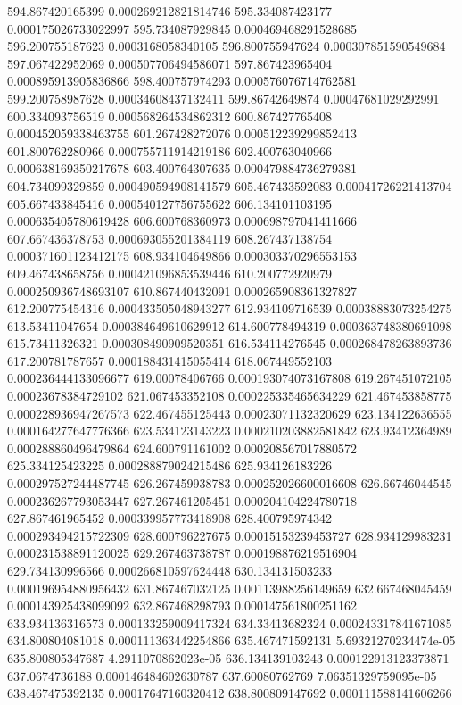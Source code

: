 {594.867420165399 0.000269212821814746
595.334087423177 0.000175026733022997
595.734087929845 0.000469468291528685
596.200755187623 0.0003168058340105
596.800755947624 0.000307851590549684
597.067422952069 0.000507706494586071
597.867423965404 0.000895913905836866
598.400757974293 0.000576076714762581
599.200758987628 0.00034608437132411
599.86742649874 0.00047681029292991
600.334093756519 0.000568264534862312
600.867427765408 0.000452059338463755
601.267428272076 0.000512239299852413
601.800762280966 0.000755711914219186
602.400763040966 0.000638169350217678
603.400764307635 0.000479884736279381
604.734099329859 0.000490594908141579
605.467433592083 0.00041726221413704
605.667433845416 0.000540127756755622
606.134101103195 0.000635405780619428
606.600768360973 0.000698797041411666
607.667436378753 0.000693055201384119
608.267437138754 0.000371601123412175
608.934104649866 0.000303370296553153
609.467438658756 0.000421096853539446
610.200772920979 0.000250936748693107
610.867440432091 0.000265908361327827
612.200775454316 0.000433505048943277
612.934109716539 0.00038883073254275
613.53411047654 0.000384649610629912
614.600778494319 0.000363748380691098
615.73411326321 0.000308490909520351
616.534114276545 0.000268478263893736
617.200781787657 0.000188431415055414
618.067449552103 0.000236444133096677
619.00078406766 0.000193074073167808
619.267451072105 0.00023678384729102
621.067453352108 0.000225335465634229
621.467453858775 0.000228936947267573
622.467455125443 0.00023071132320629
623.134122636555 0.000164277647776366
623.534123143223 0.000210203882581842
623.93412364989 0.000288860496479864
624.600791161002 0.000208567017880572
625.334125423225 0.000288879024215486
625.934126183226 0.000297527244487745
626.267459938783 0.000252026600016608
626.66746044545 0.000236267793053447
627.267461205451 0.000204104224780718
627.867461965452 0.000339957773418908
628.400795974342 0.000293494215722309
628.600796227675 0.00015153239453727
628.934129983231 0.000231538891120025
629.267463738787 0.000198876219516904
629.734130996566 0.000266810597624448
630.134131503233 0.000196954880956432
631.867467032125 0.00113988256149659
632.667468045459 0.000143925438099092
632.867468298793 0.000147561800251162
633.934136316573 0.000133259009417324
634.33413682324 0.000243317841671085
634.800804081018 0.000111363442254866
635.467471592131 5.69321270234474e-05
635.800805347687 4.2911070862023e-05
636.134139103243 0.000122913123373871
637.0674736188 0.000146484602630787
637.60080762769 7.06351329759095e-05
638.467475392135 0.00017647160320412
638.800809147692 0.000111588141606266
}
